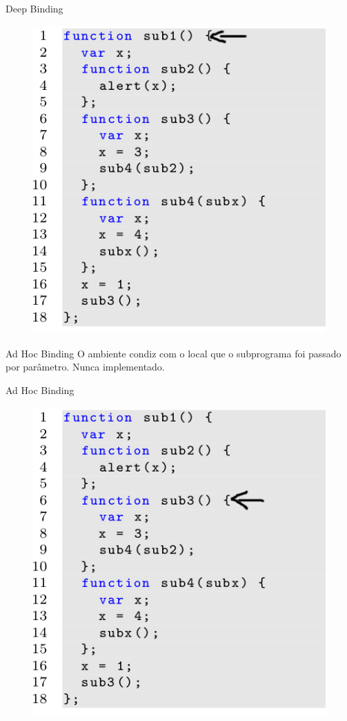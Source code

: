 \begin{frame}{Deep Binding}
	\begin{figure}[ht!]
		\centering
		\includegraphics[scale=0.4]{./imgs/js-deep}
	\end{figure}
\end{frame}

\begin{frame}{Ad Hoc Binding}
	O ambiente condiz com o local que o subprograma foi passado por parâmetro.
	Nunca implementado.
\end{frame}

\begin{frame}{Ad Hoc Binding}
	\begin{figure}[ht!]
		\centering
		\includegraphics[scale=0.4]{./imgs/js-adhoc}
	\end{figure}
\end{frame}

